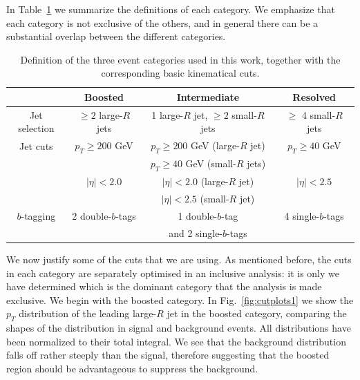 In Table~\ref{sec:categorisation} we summarize the definitions of each
category.
%
We emphasize that each category is not exclusive of the others,
and in general there can be a substantial overlap
between the different categories.




\begin{table}[h]
  \centering
  \small
  \begin{tabular}{c|c|c|c}
    \hline
    &  Boosted  &  Intermediate  &  Resolved  \\
    \hline
    \hline 
    Jet selection  &  $\ge 2$ large-$R$ jets  & 1 large-$R$ jet, $\ge 2$ small-$R$
    jets  &  $\ge$ 4 small-$R$ jets \\
    \hline
    Jet cuts  & $p_T \ge 200$ GeV   &  $p_T \ge 200$ GeV (large-$R$ jet)
    &  $p_T \ge 40$ GeV \\
    &  & $p_T \ge 40$ GeV (small-$R$ jets)   &    \\
    &   $|\eta|<2.0$  & $|\eta|<2.0$ (large-$R$ jet) & $|\eta|<2.5$ \\
    &        & $|\eta|<2.5$ (small-$R$ jet)  &  \\
    \hline
    $b$-tagging  & 2 double-$b$-tags  & 1 double-$b$-tag & 4 single-$b$-tags \\
      &  & and 2 single-$b$-tags  &  \\
    \hline
    \end{tabular}
  \caption{\small Definition of the three event categories used in this
    work, together with the corresponding basic kinematical cuts.
\label{sec:categorisation}
  }
\end{table}


We now justify some of the cuts that we are using.
%
As mentioned before, the cuts in each category are separately
optimised in an inclusive analysis: it is only we have determined
which is the dominant category that the analysis is made exclusive.
%
We begin with the boosted category.
%
In Fig.~\ref{fig:cutplots1} we show
the $p_T$ distribution of the
  leading large-$R$ jet in the boosted category, comparing
  the shapes of the distribution in signal and background events.
  All distributions have been normalized to their total integral.
  We see that the background distribution
  falls off rather steeply than the signal, therefore
  suggesting that the boosted region should be
  advantageous to suppress the background.


